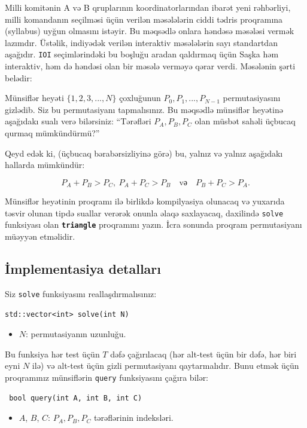 \documentclass[12pt]{article}
\begin{document}
\renewcommand{\headerLang}{Azərbaycan dili}
\renewcommand{\problemName}{AB23. ÜÇBUCAQ}

\renewcommand{\headerLeft}{IATI Gün 2, Yuxarı yaş qrupu}
\renewcommand{\headerRightFirst}{XVII BEYNƏLXALQ İNFORMATİKA TURNİRİ}
\renewcommand{\headerRightSecond}{ONLAYN 2026}

\renewcommand{\tl}{$10$ san.}
\renewcommand{\ml}{$1024$ MB}
\problem{Məsələ \problemName}

Milli komitənin A və B qruplarının koordinatorlarından ibarət yeni rəhbərliyi, milli komandanın seçilməsi üçün verilən məsələlərin ciddi tədris proqramına (syllabus) uyğun olmasını istəyir. Bu məqsədlə onlara həndəsə məsələsi vermək lazımdır. Üstəlik, indiyədək verilən interaktiv məsələlərin sayı standartdan aşağıdır. \texttt{IOI} seçimlərindəki bu boşluğu aradan qaldırmaq üçün Saşka həm interaktiv, həm də həndəsi olan bir məsələ verməyə qərar verdi. Məsələnin şərti belədir:

Münsiflər heyəti $\{1,2,3,...,N\}$ çoxluğunun $P_0,P_1,...,P_{N-1}$ permutasiyasını gizlədib. Siz bu permutasiyanı tapmalısınız. Bu məqsədlə münsiflər heyətinə aşağıdakı sualı verə bilərsiniz: ``Tərəfləri $P_A,P_B,P_C$ olan müsbət sahəli üçbucaq qurmaq mümkündürmü?''

Qeyd edək ki, (üçbucaq bərabərsizliyinə görə) bu, yalnız və yalnız aşağıdakı hallarda mümkündür:

\[P_A + P_B > P_C,\ P_A + P_C > P_B \quad \text{və} \quad P_B + P_C > P_A.\]

Münsiflər heyətinin proqramı ilə birlikdə kompilyasiya olunacaq və yuxarıda təsvir olunan tipdə suallar verərək onunla əlaqə saxlayacaq, daxilində \texttt{solve} funksiyası olan \textbf{\texttt{triangle}} proqramını yazın. İcra sonunda proqram permutasiyanı müəyyən etməlidir.

\subsection{İmplementasiya detalları}
Siz \texttt{solve} funksiyasını reallaşdırmalısınız:
\begin{lstlisting}
std::vector<int> solve(int N)
\end{lstlisting}
\begin{itemize}
	\item $N$: permutasiyanın uzunluğu.
\end{itemize}

Bu funksiya hər test üçün $T$ dəfə çağırılacaq (hər alt-test üçün bir dəfə, hər biri eyni $N$ ilə) və alt-test üçün gizli permutasiyanı qaytarmalıdır. Bunu etmək üçün proqramınız münsiflərin \texttt{query} funksiyasını çağıra bilər:
\begin{lstlisting}
 bool query(int A, int B, int C)
\end{lstlisting}
\begin{itemize}
	\item $A$, $B$, $C$: $P_A, P_B, P_C$ tərəflərinin indeksləri.
\end{itemize}
\end{document}
